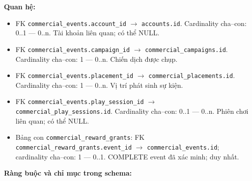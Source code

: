 \textbf{Quan hệ:}

\begin{itemize}

\item FK \texttt{commercial\_events.account\_id} $\rightarrow$ \texttt{accounts.id}. Cardinality cha--con: 0..1 — 0..n. Tài khoản liên quan; có thể NULL.

\item FK \texttt{commercial\_events.campaign\_id} $\rightarrow$ \texttt{commercial\_campaigns.id}. Cardinality cha--con: 1 — 0..n. Chiến dịch được chụp.

\item FK \texttt{commercial\_events.placement\_id} $\rightarrow$ \texttt{commercial\_placements.id}. Cardinality cha--con: 1 — 0..n. Vị trí phát sinh sự kiện.

\item FK \texttt{commercial\_events.play\_session\_id} $\rightarrow$ \texttt{commercial\_play\_sessions.id}. Cardinality cha--con: 0..1 — 0..n. Phiên chơi liên quan; có thể NULL.

\item Bảng con \texttt{commercial\_reward\_grants}: FK \texttt{commercial\_reward\_grants.event\_id} $\rightarrow$ \texttt{commercial\_events.id}; cardinality cha--con: 1 — 0..1. COMPLETE event đã xác minh; duy nhất.

\end{itemize}

\textbf{Ràng buộc và chỉ mục trong schema:}

